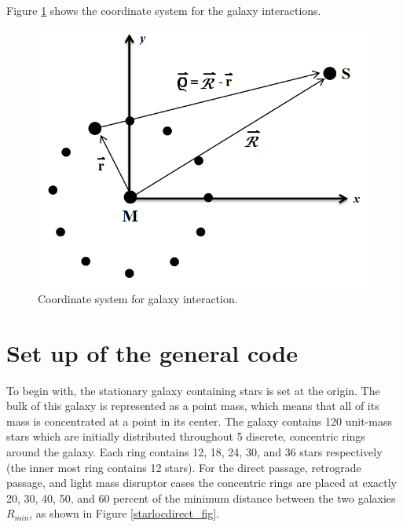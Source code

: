 \documentclass[11pt]{article}
\begin{document}
Figure \ref{coords_fig} shows the coordinate system for the galaxy interactions.

\begin{figure}[h!]
\centering
\includegraphics[width=5in]{../Figure2.png}
\caption{Coordinate system for galaxy interaction.}
\label{coords_fig}
\end{figure}

\section{Set up of the general code}\label{Setup_sec}

To begin with, the stationary galaxy containing stars is set at the origin.  The bulk of this galaxy is represented as a point mass, which means that all of its mass is concentrated at a point in its center.  The galaxy contains 120 unit-mass stars which are initially distributed throughout 5 discrete, concentric rings around the galaxy.  Each ring contains 12, 18, 24, 30, and 36 stars respectively (the inner most ring contains 12 stars).  For the direct passage, retrograde passage, and light mass disruptor cases the concentric rings are placed at exactly 20, 30, 40, 50, and 60 percent of the minimum distance between the two galaxies $R_{min}$, as shown in Figure \ref{starlocdirect_fig}. 
\end{document}
